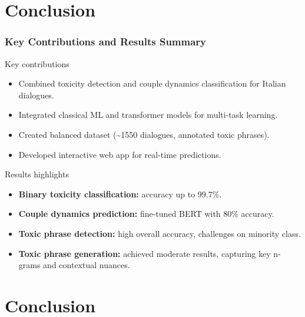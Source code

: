 \documentclass{beamer}
\begin{document}
\section{Conclusion}

\begin{frame}
\frametitle{Key Contributions and Results Summary}

\begin{block}{Key contributions}
\begin{itemize}
\item Combined toxicity detection and couple dynamics classification for Italian dialogues.
\item Integrated classical ML and transformer models for multi-task learning.
\item Created balanced dataset (\textasciitilde 1550 dialogues, annotated toxic phrases).
\item Developed interactive web app for real-time predictions.
\end{itemize}
\end{block}

\begin{block}{Results highlights}
\begin{itemize}
\item \textbf{Binary toxicity classification:} accuracy up to 99.7\%.
\item \textbf{Couple dynamics prediction:} fine-tuned BERT with 80\% accuracy.
\item \textbf{Toxic phrase detection:} high overall accuracy, challenges on minority class.
\item \textbf{Toxic phrase generation:} achieved moderate results, capturing key n-grams and contextual nuances.
\end{itemize}
\end{block}

\end{frame}




\section{Conclusion}
\end{document}
